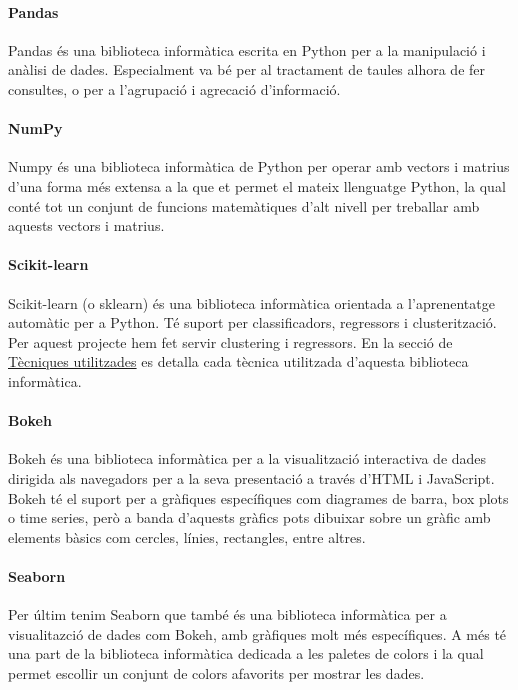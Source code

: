 \documentclass[12pt,a4paper,catalan]{article}
\begin{document}
\hypertarget{pandas}{
	\paragraph{Pandas}
}
Pandas és una biblioteca informàtica escrita en Python per a la manipulació i anàlisi de dades. Especialment va bé per al tractament de taules alhora de fer consultes, o per a l'agrupació i agrecació d'informació.

\hypertarget{numpy}{
	\paragraph{NumPy}
}
Numpy és una biblioteca informàtica de Python per operar amb vectors i matrius d'una forma més extensa a la que et permet el mateix llenguatge Python, la qual conté tot un conjunt de funcions matemàtiques d'alt nivell per treballar amb aquests vectors i matrius.

\hypertarget{sklearn}{
	\paragraph{Scikit-learn}
}
Scikit-learn (o sklearn) és una biblioteca informàtica orientada a l'aprenentatge automàtic per a Python. Té suport per classificadors, regressors i clusterització. Per aquest projecte hem fet servir clustering i regressors. En la secció de \hyperlink{tecniquesutilitzades}{Tècniques utilitzades} es detalla cada tècnica utilitzada d'aquesta biblioteca informàtica.

\paragraph{Bokeh}
Bokeh és una biblioteca informàtica per a la visualització interactiva de dades dirigida als navegadors per a la seva presentació a través d'HTML i JavaScript. Bokeh té el suport per a gràfiques específiques com diagrames de barra, box plots o time series, però a banda d'aquests gràfics pots dibuixar sobre un gràfic amb elements bàsics com cercles, línies, rectangles, entre altres.

\paragraph{Seaborn}
Per últim tenim Seaborn que també és una biblioteca informàtica per a visualitazció de dades com Bokeh, amb gràfiques molt més específiques. A més té una part de la biblioteca informàtica dedicada a les paletes de colors i la qual permet escollir un conjunt de colors afavorits per mostrar les dades.
\end{document}
